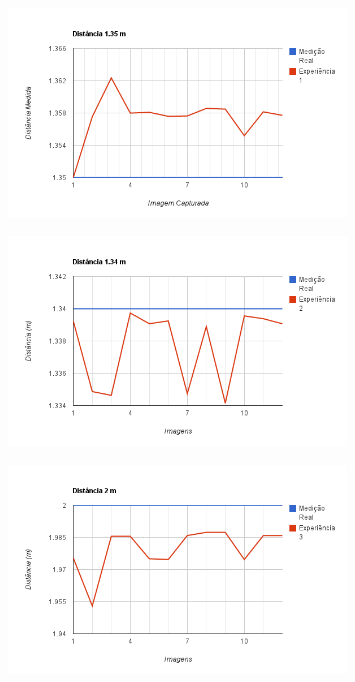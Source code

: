 \begin{figure}
\begin{center}
	\includegraphics[width=0.80\textwidth]{figures/experiencia/chart_1.png}
	\label{fig:chart_1}
\end{center}
\end{figure}

\begin{figure}
\begin{center}
	\includegraphics[width=0.80\textwidth]{figures/experiencia/chart_2.png}
	\label{fig:chart_2}
\end{center}
\end{figure}

\begin{figure}
\begin{center}
	\includegraphics[width=0.80\textwidth]{figures/experiencia/chart_3.png}
	\label{fig:chart_3}
\end{center}
\end{figure}

